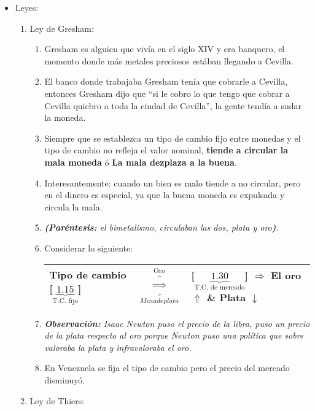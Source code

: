 \begin{itemize}
    \item Leyes:
        \begin{enumerate}
            \item Ley de Gresham:
                \begin{enumerate}
                    \item Gresham es alguien que vivía en el siglo XIV y era banquero, el momento donde más metales preciosos estában llegando a Cevilla.
                    \item El banco donde trabajaba Gresham tenía que cobrarle a Cevilla, entonces Gresham dijo que ``si le cobro lo que tengo que cobrar a Cevilla quiebro a toda la ciudad de Cevilla'', la gente tendía a sudar la moneda.
                    \item Siempre que se establezca un tipo de cambio fijo entre monedas y el tipo de cambio no refleja el valor nominal, \textbf{tiende a circular la mala moneda} ó \textbf{La mala dezplaza a la buena}.
                    \item Interesantemente: cuando un bien es malo tiende a no circular, pero en el dinero es especial, ya que la buena moneda es expulsada y circula la mala.
                    \item \emph{\textbf{(Paréntesis:} el bimetalismo, circulaban las dos, plata y oro\textbf{)}}.
                    \item Considerar lo siguiente:
                        \begin{center}
                        \begin{tabular}{ | p{5cm} | p{5cm} | p{5cm} | }
                         \hline
                         Tipo de cambio [$\underbrace{1.15}_{\text{T.C. fijo}}$] & $\overbrace{\underbrace{\Rightarrow}_{Mina de plata}}^{\text{Oro}} $ & [$\underbrace{1.30}_{\text{T.C. de mercado}}$] $\Rightarrow$ El oro $\Uparrow$ \& Plata $\downarrow$\\
                         \hline
                        \end{tabular}
                        \end{center}
                    
                    \item \emph{\textbf{Observación: }Isaac Newton puso el precio de la libra, puso un precio de la plata respecto al oro porque Newton puso una política que sobre valoraba la plata y infravaloraba el oro.}
                    \item En Venezuela se fija el tipo de cambio pero el precio del mercado disminuyó. 
                \end{enumerate}
            \item Ley de Thiers:
        \end{enumerate}
\end{itemize}
